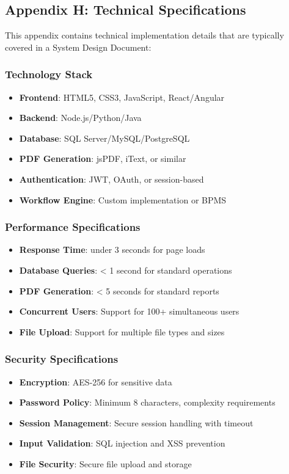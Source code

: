 \documentclass[12pt,a4paper]{article}
\begin{document}
\subsection{Appendix H: Technical Specifications}
This appendix contains technical implementation details that are typically covered in a System Design Document:

\subsubsection{Technology Stack}
\begin{itemize}
    \item \textbf{Frontend}: HTML5, CSS3, JavaScript, React/Angular
    \item \textbf{Backend}: Node.js/Python/Java
    \item \textbf{Database}: SQL Server/MySQL/PostgreSQL
    \item \textbf{PDF Generation}: jsPDF, iText, or similar
    \item \textbf{Authentication}: JWT, OAuth, or session-based
    \item \textbf{Workflow Engine}: Custom implementation or BPMS
\end{itemize}

\subsubsection{Performance Specifications}
\begin{itemize}
    \item \textbf{Response Time}: under 3 seconds for page loads
    \item \textbf{Database Queries}: < 1 second for standard operations
    \item \textbf{PDF Generation}: < 5 seconds for standard reports
    \item \textbf{Concurrent Users}: Support for 100+ simultaneous users
    \item \textbf{File Upload}: Support for multiple file types and sizes
\end{itemize}

\subsubsection{Security Specifications}
\begin{itemize}
    \item \textbf{Encryption}: AES-256 for sensitive data
    \item \textbf{Password Policy}: Minimum 8 characters, complexity requirements
    \item \textbf{Session Management}: Secure session handling with timeout
    \item \textbf{Input Validation}: SQL injection and XSS prevention
    \item \textbf{File Security}: Secure file upload and storage
\end{itemize}
\end{document}
